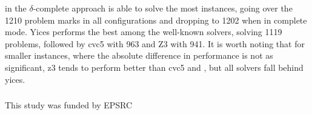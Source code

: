 \documentclass[runningheads]{llncs}
\begin{document}
\dlinear in the $\delta$-complete approach is able to solve the most instances, going over the 1210 problem marks in all configurations and dropping to 1202 when in complete mode.
Yices performs the best among the well-known solvers, solving 1119 problems, followed by cvc5 with 963 and Z3 with 941.
It is worth noting that for smaller instances, where the absolute difference in performance is not as significant, z3 tends to perform better than cvc5 and \dlinear, but all solvers fall behind yices.


\begin{credits}
    \subsubsection{\ackname} This study was funded by EPSRC
\end{credits}




\end{document}
